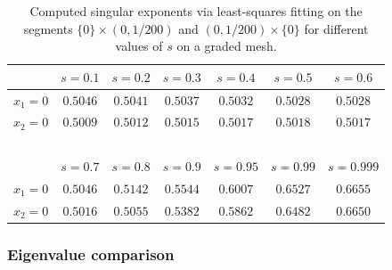 \documentclass{amsart}
\theoremstyle{plain}
\numberwithin{equation}{section}
\numberwithin{table}{section}
\numberwithin{figure}{section}
\numberwithin{theorem}{section}
\numberwithin{corollary}{section}
\numberwithin{definition}{section}
\numberwithin{lemma}{section}
\numberwithin{proposition}{section}
\numberwithin{remark}{section}
\begin{document}
\begin{table}[h!]
\begin{center}
\begin{tabular}{c|c|c|c|c|c|c|} 
\cline{2-7}
 & $s = 0.1$  &  $s = 0.2$ & $s = 0.3$  &  $s = 0.4$ & $s = 0.5$  & $s = 0.6$\\ \hline
\multicolumn{1}{|c|}{$x_1=0$} & $0.5046$ & $0.5041$ & $0.5037$ & $0.5032$ & $0.5028$ & $0.5028$\\
\hline
\multicolumn{1}{|c|}{$x_2=0$} & $0.5009$ & $0.5012$ & $0.5015$ & $0.5017$ & $0.5018$ & $0.5017$\\
\hline
\multicolumn{1}{c}{ \ }  \\
\cline{2-7}
 & $s = 0.7$ & $s = 0.8$ & $s = 0.9$ & $s=0.95$  & $s=0.99$ & $s=0.999$ \\ \hline
\multicolumn{1}{|c|}{$x_1=0$}  & $0.5046$ & $0.5142$ & $0.5544$ & $0.6007$ & $0.6527$ & $0.6655$\\
\hline
\multicolumn{1}{|c|}{$x_2=0$}   & $0.5016$ & $0.5055$ & $0.5382$ & $0.5862$ & $0.6482$ & $0.6650$\\
\hline
\end{tabular}
	\caption{Computed singular exponents via least-squares fitting on the segments $\{0\} \times (0,1/200)$ and $(0,1/200) \times  \{0\}$  for different values of $s$ on a graded mesh.} 	\label{tab:least-squares-graded}
 \end{center}
\end{table}

\subsubsection{Eigenvalue comparison} \label{sec:eigenvalues}
\end{document}
